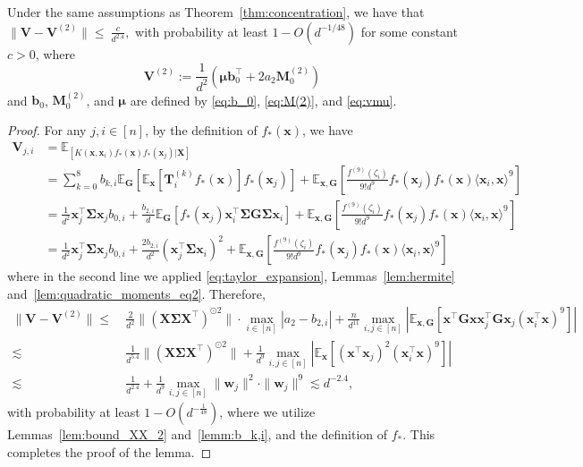 \documentclass[twoside,11pt]{article}
\newcommand{\bw}{\boldsymbol{w}}
\newcommand{\E}{\mathbb{E}}
\def\bG{{\boldsymbol G}}
\def\bT{{\boldsymbol T}}
\def\bV{{\boldsymbol V}}
\def\bX{{\boldsymbol X}}
\def\bM{{\boldsymbol M}}
\def\bb{{\boldsymbol b}}
\def\bw{{\boldsymbol w}}
\def\bx{{\boldsymbol x}}
\def\bSigma{{\boldsymbol \Sigma}}
\newcommand{\vmu}{\mbi{\mu}}
\newcommand{\1}{\mathbf{1}}
\def\mbi#1{\boldsymbol{#1}}
\def\mbi#1{\boldsymbol{#1}} %
\begin{document}
\begin{lemma}\label{lemma:diff_v}
Under the same assumptions as Theorem~\ref{thm:concentration}, we have that
    $
        \|\bV-\bV^{(2)}\|\le ~ \frac{c }{d^{2.4}},
    $
    with probability  at least $1-O(d^{-1/48})$ for some constant $c>0$, where
    \begin{equation}
        \bV^{(2)}:=\frac{1}{d^2}(\vmu\bb_0^\top+2a_2\bM_0^{(2)})
    \end{equation} and $\bb_0$, $\bM_0^{(2)}$, and $\vmu$ are defined by \eqref{eq:b_0}, \eqref{eq:M(2)}, and \eqref{eq:vmu}.
\end{lemma}
\begin{proof}
For any $j,i\in [n]$, by the definition of $f_*(\bx)$, we have
\begin{align}
\bV_{j,i}&=\E_[K(\bx,\bx_i)f_*(\bx)f_*(\bx_j)|\bX]\\
&=\sum_{k=0}^8b_{k,i}\E_{\bG}[\E_{\bx}[ \bT_{i}^{(k)}f_*(\bx)]f_*(\bx_j)]+\E_{\bx,\bG}\left[\frac{f^{(9)}(\zeta_{i})}{9!d^9}f_*(\bx_j)f_*(\bx)\langle \bx_i,\bx \rangle^9\right]\\
&= \frac{1}{d^2}\bx_j^\top\bSigma\bx_j b_{0,i} + \frac{b_{2,i}}{d}\E_{\bG}[f_*(\bx_j)\bx_i^\top\bSigma\bG\bSigma\bx_i]+\E_{\bx,\bG}\left[\frac{f^{(9)}(\zeta_{i})}{9!d^9}f_*(\bx_j)f_*(\bx)\langle \bx_i,\bx \rangle^9\right]\\
&= \frac{1}{d^2}\bx_j^\top\bSigma\bx_j b_{0,i} + \frac{2b_{2,i}}{d^2}(\bx_j^\top\bSigma\bx_i)^2+\E_{\bx,\bG}\left[\frac{f^{(9)}(\zeta_{i})}{9!d^9}f_*(\bx_j)f_*(\bx)\langle \bx_i,\bx \rangle^9\right]
\end{align}
where in the second line we applied \eqref{eq:taylor_expansion}, Lemmas~\ref{lem:hermite} and~\ref{lem:quadratic_moments_eq2}. 
Therefore,
\begin{align}
    \|\bV-\bV^{(2)}\|\le ~&\frac{2}{d^2}\|(\bX\bSigma\bX^\top)^{\odot 2}\|\cdot\max_{i\in [n]}|a_2-b_{2,i}|+\frac{n}{d^{11}}\max_{i,j\in [n]}|\E_{\bx,\bG}[\bx^\top\bG\bx\bx_j^\top\bG\bx_j(\bx_i^\top\bx)^9]|\\
    \lesssim~& \frac{1}{d^{5.4}}\|(\bX\bSigma\bX^\top)^{\odot 2}\|+\frac{1}{d^{9}}\max_{i,j\in [n]}|\E_{\bx}[(\bx^\top\bx_j)^2 (\bx_i^\top\bx)^9]|\\
    \lesssim~& \frac{1}{d^{2.4}} +\frac{1}{d^9} \max_{i,j\in [n]}\|\bw_j\|^2\cdot\|\bw_j\|^{9}\lesssim d^{-2.4}, 
\end{align} 
with probability at least $1-O(d^{-\frac{1}{48}})$, where we utilize Lemmas~\ref{lem:bound_XX_2} and~\ref{lemm:b_k,i}, and the definition of $f_*$.  This completes the proof of the lemma.
\end{proof}
 
\end{document}
